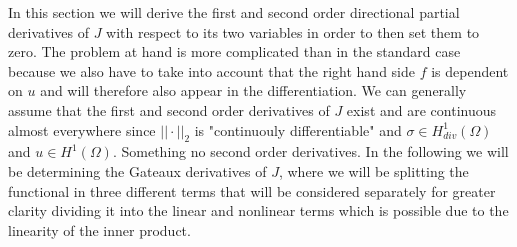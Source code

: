 \documentclass[../draft_1.tex]{subfiles}
\begin{document}
In this section we will derive the first and second order directional partial derivatives of $J$ with respect to its two variables in order to then set them to zero. The problem at hand is more complicated than in the standard case because we also have to take into account that the right hand side $f$ is dependent on $u$ and will therefore also appear in the differentiation. We can generally assume that the first and second order derivatives of $J$ exist and are continuous almost everywhere since $|| \cdot ||_2$ is "continuouly differentiable" and $\sigma \in H_{div}^1(\Omega)$ and $u \in H^1(\Omega)$. Something no second order derivatives. In the following we will be determining the Gateaux derivatives of $J$, where we will be splitting the functional in three different terms that will be considered separately for greater clarity dividing it into the linear and nonlinear terms which is possible due to the linearity of the inner product. 
\end{document}
